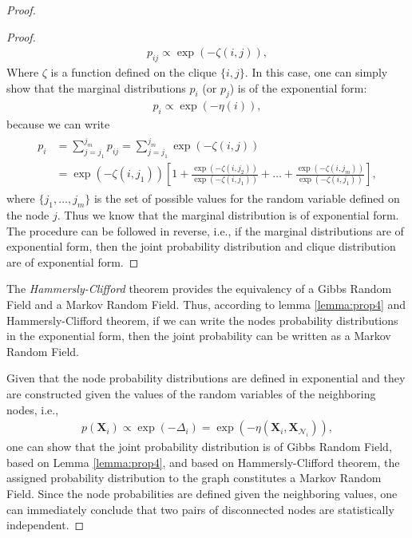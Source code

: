 \documentclass{article}
\begin{document}
\begin{proof}
\begin{proof}
		\begin{gather}
			p_{ij} \propto \exp(-\zeta(i, j)),
		\end{gather}
		Where $\zeta$ is a function defined on the clique $\{i, j\}$. In this case, one can simply show that the marginal distributions $p_i$ (or $p_j$) is of the exponential form:
		\begin{gather}
			p_i \propto \exp(-\eta(i)),
		\end{gather}	
		because we can write
		\begin{gather}
			\begin{aligned}
				p_i & = \sum_{j=j_1}^{j_m}p_{ij}=\sum_{j=j_1}^{j_m}\exp(-\zeta(i, j))\\
				& = \exp(-\zeta(i, j_1))[1+ \frac{\exp(-\zeta(i, j_2))}{\exp(-\zeta(i, j_1))}+\dots+\frac{\exp(-\zeta(i, j_m))}{\exp(-\zeta(i, j_1))}],
			\end{aligned}
		\end{gather}
		where $\{j_1, \dots, j_m\}$ is the set of possible values for the random variable defined on the node $j$. Thus we know that the marginal distribution is of exponential form. The procedure can be followed in reverse, i.e., if the marginal distributions are of exponential form, then the joint probability distribution and clique distribution are of exponential form.
	\end{proof}
	The \textit{Hammersly-Clifford} theorem \cite{statsdict} provides the equivalency of a Gibbs Random Field and a Markov Random Field. Thus, according to lemma \ref{lemma:prop4} and Hammersly-Clifford theorem, if we can write the nodes probability distributions in the exponential form, then the joint probability can be written as a Markov Random Field. 
	
	Given that the node probability distributions are defined in exponential and they are constructed given the values of the random variables of the neighboring nodes, i.e., 
	\begin{gather}
		p(\mathbf{X}_i) \propto \exp(-\Delta_i)=\exp(-\eta(\mathbf{X}_i, \mathbf{X}_{\mathcal{N}_i})),
	\end{gather}
	one can show that the joint probability distribution is of Gibbs Random Field, based on Lemma \ref{lemma:prop4}, and based on Hammersly-Clifford theorem, the assigned probability distribution to the graph constitutes a Markov Random Field. Since the node probabilities are defined given the neighboring values, one can immediately conclude that two pairs of disconnected nodes are statistically independent.
\end{proof}
\end{document}
